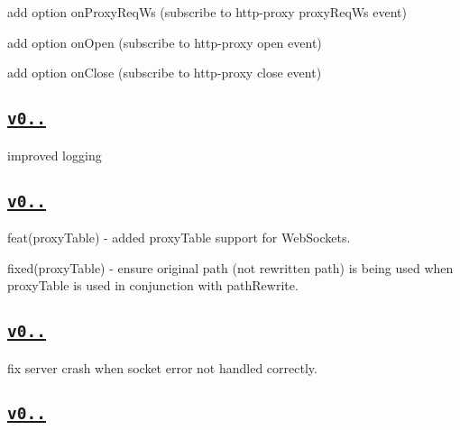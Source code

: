 \begin{DoxyItemize}
\item add option {\ttfamily on\+Proxy\+Req\+Ws} (subscribe to http-\/proxy {\ttfamily proxy\+Req\+Ws} event)
\item add option {\ttfamily on\+Open} (subscribe to http-\/proxy {\ttfamily open} event)
\item add option {\ttfamily on\+Close} (subscribe to http-\/proxy {\ttfamily close} event)
\end{DoxyItemize}

\subsection*{\href{https://github.com/chimurai/http-proxy-middleware/releases/tag/v0.11.0}{\tt v0..}}


\begin{DoxyItemize}
\item improved logging
\end{DoxyItemize}

\subsection*{\href{https://github.com/chimurai/http-proxy-middleware/releases/tag/v0.10.0}{\tt v0..}}


\begin{DoxyItemize}
\item feat(proxy\+Table) -\/ added proxy\+Table support for Web\+Sockets.
\item fixed(proxy\+Table) -\/ ensure original path (not rewritten path) is being used when {\ttfamily proxy\+Table} is used in conjunction with {\ttfamily path\+Rewrite}.
\end{DoxyItemize}

\subsection*{\href{https://github.com/chimurai/http-proxy-middleware/releases/tag/v0.9.1}{\tt v0..}}


\begin{DoxyItemize}
\item fix server crash when socket error not handled correctly.
\end{DoxyItemize}

\subsection*{\href{https://github.com/chimurai/http-proxy-middleware/releases/tag/v0.9.0}{\tt v0..}}



